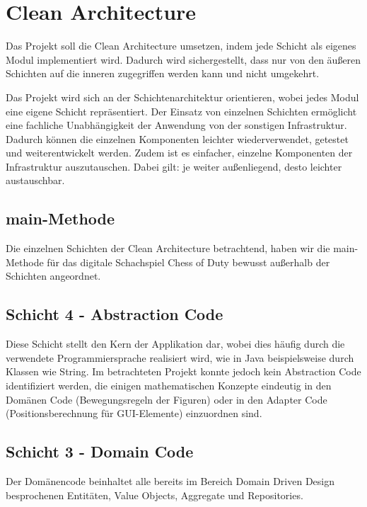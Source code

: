 \chapter{Clean Architecture}

Das Projekt soll die Clean Architecture umsetzen, indem jede Schicht als eigenes Modul implementiert wird. 
Dadurch wird sichergestellt, dass nur von den äußeren Schichten auf die inneren zugegriffen werden kann und nicht umgekehrt. 

Das Projekt wird sich an der Schichtenarchitektur orientieren, wobei jedes Modul eine eigene Schicht repräsentiert. 
Der Einsatz von einzelnen Schichten ermöglicht eine fachliche Unabhängigkeit der Anwendung von der sonstigen Infrastruktur. 
Dadurch können die einzelnen Komponenten leichter wiederverwendet, getestet und weiterentwickelt werden. 
Zudem ist es einfacher, einzelne Komponenten der Infrastruktur auszutauschen. 
Dabei gilt: je weiter außenliegend, desto leichter austauschbar.


\section{main-Methode}

Die einzelnen Schichten der Clean Architecture betrachtend, haben wir die main-Methode für das digitale Schachspiel \glqq Chess of Duty\grqq{} bewusst außerhalb der Schichten angeordnet. 




\section*{Schicht 4 - Abstraction Code}

Diese Schicht stellt den Kern der Applikation dar, wobei dies häufig durch die verwendete Programmiersprache realisiert wird, wie in Java beispielsweise durch Klassen wie String.
Im betrachteten Projekt konnte jedoch kein Abstraction Code identifiziert werden, die einigen mathematischen Konzepte eindeutig in den Domänen Code (Bewegungsregeln der Figuren) oder in den Adapter Code (Positionsberechnung für GUI-Elemente) einzuordnen sind. 

\section*{Schicht 3 - Domain Code}

Der Domänencode beinhaltet alle bereits im Bereich \glqq Domain Driven Design\grqq{} besprochenen Entitäten, Value Objects, Aggregate und Repositories. 

